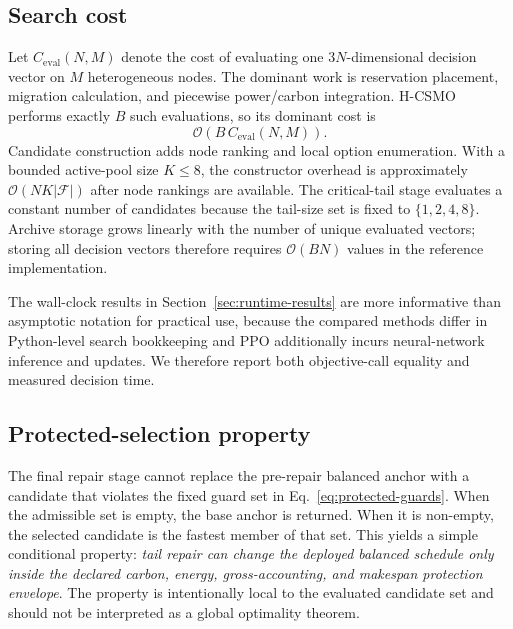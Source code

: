 \documentclass[preprint,12pt]{elsarticle}
\newcommand{\method}{H-CSMO\xspace}
\begin{document}
\subsection{Search cost}

Let $C_{\mathrm{eval}}(N,M)$ denote the cost of evaluating one $3N$-dimensional decision vector on $M$ heterogeneous nodes. The dominant work is reservation placement, migration calculation, and piecewise power/carbon integration. \method performs exactly $B$ such evaluations, so its dominant cost is
\begin{equation}
\mathcal{O}\left(B\,C_{\mathrm{eval}}(N,M)\right).
\end{equation}
Candidate construction adds node ranking and local option enumeration. With a bounded active-pool size $K\le 8$, the constructor overhead is approximately $\mathcal{O}(NK|\mathcal{F}|)$ after node rankings are available. The critical-tail stage evaluates a constant number of candidates because the tail-size set is fixed to $\{1,2,4,8\}$. Archive storage grows linearly with the number of unique evaluated vectors; storing all decision vectors therefore requires $\mathcal{O}(BN)$ values in the reference implementation.

The wall-clock results in Section~\ref{sec:runtime-results} are more informative than asymptotic notation for practical use, because the compared methods differ in Python-level search bookkeeping and PPO additionally incurs neural-network inference and updates. We therefore report both objective-call equality and measured decision time.

\subsection{Protected-selection property}

The final repair stage cannot replace the pre-repair balanced anchor with a candidate that violates the fixed guard set in Eq.~\eqref{eq:protected-guards}. When the admissible set is empty, the base anchor is returned. When it is non-empty, the selected candidate is the fastest member of that set. This yields a simple conditional property: \emph{tail repair can change the deployed balanced schedule only inside the declared carbon, energy, gross-accounting, and makespan protection envelope}. The property is intentionally local to the evaluated candidate set and should not be interpreted as a global optimality theorem.
\end{document}
